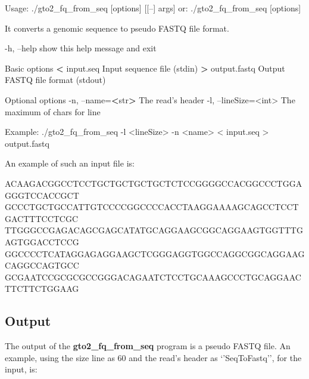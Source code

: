 \documentclass[11pt,]{krantz}
\newenvironment{Shaded}{\begin{snugshade}}{\end{snugshade}}
\newcommand{\StringTok}[1]{\textcolor[rgb]{0.5,0.5,0.5}{#1}}
\newcommand{\OperatorTok}[1]{\textcolor[rgb]{0.43,0.43,0.43}{\textbf{#1}}}
\newcommand{\ExtensionTok}[1]{#1}
\newcommand{\NormalTok}[1]{#1}
\begin{document}
\begin{Shaded}
\begin{Highlighting}[]
\ExtensionTok{Usage}\NormalTok{: ./gto2_fq_from_seq [options] [[--] args]}
   \ExtensionTok{or}\NormalTok{: ./gto2_fq_from_seq [options]}

\ExtensionTok{It}\NormalTok{ converts a genomic sequence to pseudo FASTQ file format.}

    \ExtensionTok{-h}\NormalTok{, --help            show this help message and exit}

\ExtensionTok{Basic}\NormalTok{ options}
    \OperatorTok{<} \ExtensionTok{input.seq}\NormalTok{           Input sequence file (stdin)}
    \OperatorTok{>} \ExtensionTok{output.fastq}\NormalTok{        Output FASTQ file format (stdout)}

\ExtensionTok{Optional}\NormalTok{ options}
    \ExtensionTok{-n}\NormalTok{, --name=}\OperatorTok{<}\NormalTok{str}\OperatorTok{>}\NormalTok{      The read}\StringTok{'s header}
\StringTok{    -l, --lineSize=<int>  The maximum of chars for line}

\StringTok{Example: ./gto2_fq_from_seq -l <lineSize> -n <name> < }
\StringTok{input.seq > output.fastq}
\end{Highlighting}
\end{Shaded}

An example of such an input file is:

\begin{Shaded}
\begin{Highlighting}[]
\ExtensionTok{ACAAGACGGCCTCCTGCTGCTGCTGCTCTCCGGGGCCACGGCCCTGGAGGGTCCACCGCT}
\ExtensionTok{GCCCTGCTGCCATTGTCCCCGGCCCCACCTAAGGAAAAGCAGCCTCCTGACTTTCCTCGC}
\ExtensionTok{TTGGGCCGAGACAGCGAGCATATGCAGGAAGCGGCAGGAAGTGGTTTGAGTGGACCTCCG}
\ExtensionTok{GGCCCCTCATAGGAGAGGAAGCTCGGGAGGTGGCCAGGCGGCAGGAAGCAGGCCAGTGCC}
\ExtensionTok{GCGAATCCGCGCGCCGGGACAGAATCTCCTGCAAAGCCCTGCAGGAACTTCTTCTGGAAG}
\end{Highlighting}
\end{Shaded}

\subsection*{Output}\label{output-9}


The output of the \textbf{gto2\_fq\_from\_seq} program is a pseudo FASTQ
file. An example, using the size line as 60 and the read's header as
`'SeqToFastq'', for the input, is:
\end{document}
